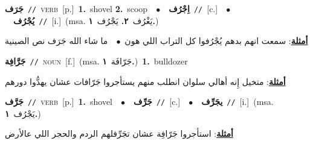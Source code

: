 \documentclass[10pt,a4paper,twoside]{article} %
\begin{document}
\begin{multicols}{2}
{\setlength\topsep{0pt}\textbf{\foreignlanguage{arabic}{جَرَف}}\ {\color{gray}\texttt{//}\color{black}}\ \textsc{verb}\ [p.]\ \textbf{1.}~shovel  \textbf{2.}~scoop\ \ $\bullet$\ \ \setlength\topsep{0pt}\textbf{\foreignlanguage{arabic}{اِجْرُف}}\ {\color{gray}\texttt{//}\color{black}}\ [c.]\ \ $\bullet$\ \ \setlength\topsep{0pt}\textbf{\foreignlanguage{arabic}{يُجْرُف}}\ {\color{gray}\texttt{//}\color{black}}\ [i.]\ \color{gray}(msa. \foreignlanguage{arabic}{يَغْرُف}~\foreignlanguage{arabic}{\textbf{٢.}}  \foreignlanguage{arabic}{يَجْرُف}~\foreignlanguage{arabic}{\textbf{١.}})\color{black}\  \begin{flushright}\color{gray}\foreignlanguage{arabic}{\textbf{\underline{\foreignlanguage{arabic}{أمثلة}}}: سمعت انهم بدهم يُجْرُفوا كل التراب اللي هون\ $\bullet$\ \  ما شاء الله جَرَف نص الصينية}\end{flushright}\color{black}} \vspace{2mm}

{\setlength\topsep{0pt}\textbf{\foreignlanguage{arabic}{جَرَّافِة}}\ {\color{gray}\texttt{//}\color{black}}\ \textsc{noun}\ [f.]\ \color{gray}(msa. \foreignlanguage{arabic}{جَرّافَة}~\foreignlanguage{arabic}{\textbf{١.}})\color{black}\ \textbf{1.}~bulldozer\  \begin{flushright}\color{gray}\foreignlanguage{arabic}{\textbf{\underline{\foreignlanguage{arabic}{أمثلة}}}: متخيل إِنه أهالي سلوان انطلب منهم يستأجروا جَرّافات عشان يهدُّوا دورهم}\end{flushright}\color{black}} \vspace{2mm}

{\setlength\topsep{0pt}\textbf{\foreignlanguage{arabic}{جَرَّف}}\ {\color{gray}\texttt{//}\color{black}}\ \textsc{verb}\ [p.]\ \textbf{1.}~shovel\ \ $\bullet$\ \ \setlength\topsep{0pt}\textbf{\foreignlanguage{arabic}{جَرِّف}}\ {\color{gray}\texttt{//}\color{black}}\ [c.]\ \ $\bullet$\ \ \setlength\topsep{0pt}\textbf{\foreignlanguage{arabic}{يجَرِّف}}\ {\color{gray}\texttt{//}\color{black}}\ [i.]\ \color{gray}(msa. \foreignlanguage{arabic}{يَجْرُف}~\foreignlanguage{arabic}{\textbf{١.}})\color{black}\  \begin{flushright}\color{gray}\foreignlanguage{arabic}{\textbf{\underline{\foreignlanguage{arabic}{أمثلة}}}: استأجروا جَرّافِة عشان تجَرِّفلهم الردم والحجر اللي عالأرض}\end{flushright}\color{black}} \vspace{2mm}


\end{multicols}
\end{document}
